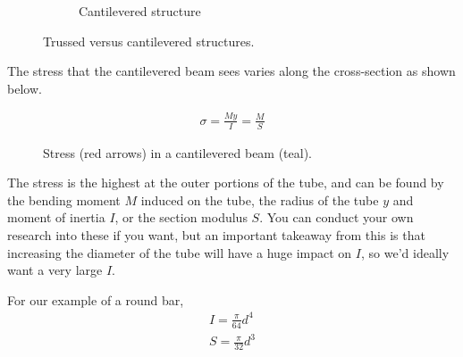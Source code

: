 \documentclass[10pt,letterpaper]{book}
\begin{document}
\begin{figure}[H]
\begin{subfigure}[b]{.35\linewidth}
\caption{Cantilevered structure}
\end{subfigure}
\caption{Trussed versus cantilevered structures.}
\end{figure}

The stress that the cantilevered beam sees varies along the cross-section as shown below.

\begin{figure}[H]
\begin{subfigure}[b]{.4\linewidth}
\end{subfigure}\begin{subfigure}[b]{.5\linewidth}
\large
\begin{align}
	\sigma = \frac{M y}{I} = \frac{M}{S}
\end{align}
\end{subfigure}
\caption{Stress (red arrows) in a cantilevered beam (teal).}
\end{figure}

The stress is the highest at the outer portions of the tube, and can be found by the bending moment $M$ induced on the tube, the radius of the tube $y$ and moment of inertia $I$, or the section modulus $S$. You can conduct your own research into these if you want, but an important takeaway from this is that increasing the diameter of the tube will have a huge impact on $I$, so we'd ideally want a very large $I$.

For our example of a round bar,
\begin{align}
	I = \frac{\pi}{64}d^4 \\
	S = \frac{\pi}{32}d^3
\end{align}
\end{document}

